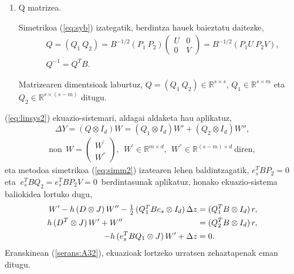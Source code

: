 \begin{enumerate}
\item Q matrizea.

Simetrikoa (\ref{eq:syb}) izategatik, berdintza hauek baieztatu daitezke,
\begin{align}
&Q=(Q_1 \ Q_2)=
B^{-1/2}(P_1 \ P_2)
\left(
\begin{matrix}
U & 0 \\
0 & V
\end{matrix}
\right)=
B^{-1/2} (P_1U \ P_2V), \\
&Q^{-1}=Q^TB.
\end{align}  

Matrizearen dimentsioak laburtuz, $Q=(Q_1 \ Q_2) \in \mathbb{R}^{s \times s}$, $Q_1 \in \mathbb{R}^{s \times m}$ eta $Q_2 \in \mathbb{R}^{s \times (s-m)}$ ditugu.

\end{enumerate}

(\ref{eq:linsys2}) ekuazio-sistemari, aldagai aldaketa hau aplikatuz,
\begin{equation}
\label{eq:DeltaYChVar}
 \Delta Y = (Q \otimes I_d) W= (Q_1 \otimes I_d) W'+ (Q_2 \otimes I_d) W'',
\end{equation}
\begin{align*}
\text{non}  \ \ W=\left(
\begin{matrix}
W^{'} \\
W^{''} 
\end{matrix}
\right),\ \ W^{'} \in \mathbb{R}^{m \times d}, \ \ W^{''} \in \mathbb{R}^{(s-m) \times d} \ \text{diren},
\end{align*}
%
eta metodoa simetrikoa (\ref{eq:simm2}) izatearen lehen baldintzagatik, $e_s^TBP_2=0$ eta $\ e_s^TBQ_2=e_s^TBP_2V=0$~berdintasunak aplikatuz, honako ekuazio-sistema baliokidea lortuko dugu,
\begin{equation}
\label{eq:linsys4}
  \begin{split}
       W' -h \, (D \otimes J)\,  W'' - \half\, (Q_1^T B e_s \otimes I_\dim) \, \Delta z &= (Q_1^T B \otimes I_\dim )\, r, \\
    h \, (D^T \otimes J)\, W'  + W'' \phantom{+\half\, (Q_2^T B e_s \otimes I_\dim) \, \Delta z  }
    &= (Q_2^T B \otimes I_\dim )\, r,\\
-h \, (e_s^T  B  Q_1 \otimes J) \, W' + \Delta z &= 0.
  \end{split}
\end{equation}
Eranskinean (\ref{serans:A32}), ekuazioak lortzeko urratsen zehaztapenak eman ditugu.

